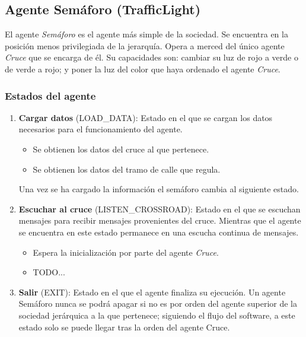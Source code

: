 \subsection{Agente Semáforo (TrafficLight)}
El agente \textit{Semáforo} es el agente más simple de la sociedad. Se encuentra en la posición menos privilegiada de la jerarquía. Opera a merced del único agente \textit{Cruce} que se encarga de él. Su capacidades son: cambiar su luz de rojo a verde o de verde a rojo; y poner la luz del color que haya ordenado el agente \textit{Cruce}. 

\subsubsection{Estados del agente}
\begin{enumerate}
    \item \textbf{Cargar datos} \footnotesize(LOAD\_DATA)\normalsize: Estado en el que se cargan los datos necesarios para el funcionamiento del agente.
    \begin{itemize}
        \item Se obtienen los datos del cruce al que pertenece.
        \item Se obtienen los datos del tramo de calle que regula.
    \end{itemize}
    Una vez se ha cargado la información el semáforo cambia al siguiente estado.
    \item \textbf{Escuchar al cruce} \footnotesize(LISTEN\_CROSSROAD)\normalsize: Estado en el que se escuchan mensajes para recibir mensajes provenientes del cruce. Mientras que el agente se encuentra en este estado permanece en una escucha continua de mensajes.
    \begin{itemize}
        \item Espera la inicialización por parte del agente \textit{Cruce}.
        \item TODO...
    \end{itemize}
    \item \textbf{Salir} \footnotesize(EXIT)\normalsize: Estado en el que el agente finaliza su ejecución. Un agente Semáforo nunca se podrá apagar si no es por orden del agente superior de la sociedad jerárquica a la que pertenece; siguiendo el flujo del software, a este estado solo se puede llegar tras la orden del agente Cruce.
\end{enumerate}

